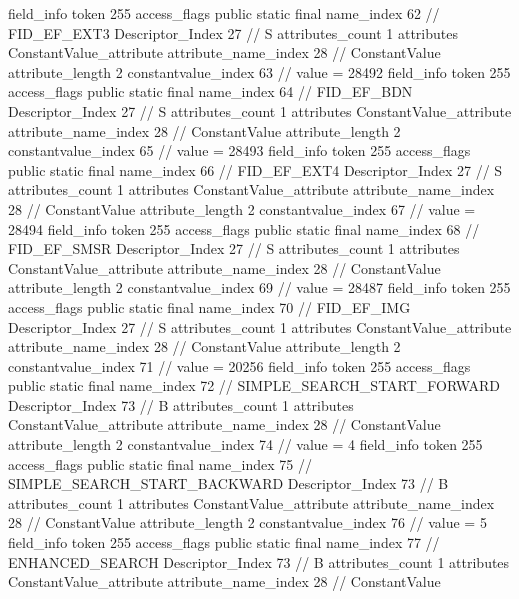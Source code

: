 {{{{{{{				}
				}
			}
			field_info {
				token	255
				access_flags	public static final
				name_index	62		// FID_EF_EXT3
				Descriptor_Index	27		// S
				attributes_count	1
				attributes {
				ConstantValue_attribute {
					attribute_name_index	28		// ConstantValue
					attribute_length	2
					constantvalue_index	63		// value = 28492
				}
				}
			}
			field_info {
				token	255
				access_flags	public static final
				name_index	64		// FID_EF_BDN
				Descriptor_Index	27		// S
				attributes_count	1
				attributes {
				ConstantValue_attribute {
					attribute_name_index	28		// ConstantValue
					attribute_length	2
					constantvalue_index	65		// value = 28493
				}
				}
			}
			field_info {
				token	255
				access_flags	public static final
				name_index	66		// FID_EF_EXT4
				Descriptor_Index	27		// S
				attributes_count	1
				attributes {
				ConstantValue_attribute {
					attribute_name_index	28		// ConstantValue
					attribute_length	2
					constantvalue_index	67		// value = 28494
				}
				}
			}
			field_info {
				token	255
				access_flags	public static final
				name_index	68		// FID_EF_SMSR
				Descriptor_Index	27		// S
				attributes_count	1
				attributes {
				ConstantValue_attribute {
					attribute_name_index	28		// ConstantValue
					attribute_length	2
					constantvalue_index	69		// value = 28487
				}
				}
			}
			field_info {
				token	255
				access_flags	public static final
				name_index	70		// FID_EF_IMG
				Descriptor_Index	27		// S
				attributes_count	1
				attributes {
				ConstantValue_attribute {
					attribute_name_index	28		// ConstantValue
					attribute_length	2
					constantvalue_index	71		// value = 20256
				}
				}
			}
			field_info {
				token	255
				access_flags	public static final
				name_index	72		// SIMPLE_SEARCH_START_FORWARD
				Descriptor_Index	73		// B
				attributes_count	1
				attributes {
				ConstantValue_attribute {
					attribute_name_index	28		// ConstantValue
					attribute_length	2
					constantvalue_index	74		// value = 4
				}
				}
			}
			field_info {
				token	255
				access_flags	public static final
				name_index	75		// SIMPLE_SEARCH_START_BACKWARD
				Descriptor_Index	73		// B
				attributes_count	1
				attributes {
				ConstantValue_attribute {
					attribute_name_index	28		// ConstantValue
					attribute_length	2
					constantvalue_index	76		// value = 5
				}
				}
			}
			field_info {
				token	255
				access_flags	public static final
				name_index	77		// ENHANCED_SEARCH
				Descriptor_Index	73		// B
				attributes_count	1
				attributes {
				ConstantValue_attribute {
					attribute_name_index	28		// ConstantValue
}}}}}}}
